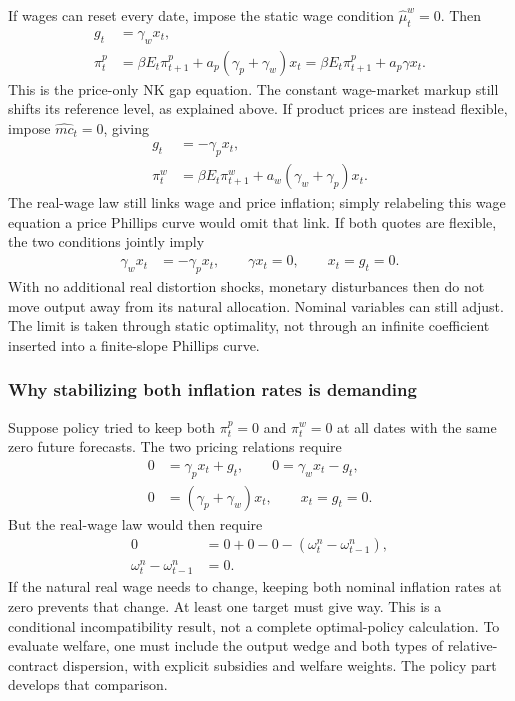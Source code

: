 If wages can reset every date, impose the static wage condition
$\hat\mu_t^w=0$. Then
\begin{align}
 g_t&=\gamma_wx_t,\\
 \pi_t^p&=\beta E_t\pi_{t+1}^p
              +a_p(\gamma_p+\gamma_w)x_t
        =\beta E_t\pi_{t+1}^p+a_p\gamma x_t.
\end{align}
This is the price-only NK gap equation. The constant wage-market markup still
shifts its reference level, as explained above. If product prices are instead
flexible, impose $\hat{mc}_t=0$, giving
\begin{align}
 g_t&=-\gamma_p x_t,\\
 \pi_t^w&=\beta E_t\pi_{t+1}^w
                  +a_w(\gamma_w+\gamma_p)x_t.
\end{align}
The real-wage law still links wage and price inflation; simply relabeling this
wage equation a price Phillips curve would omit that link. If both quotes
are flexible, the two conditions jointly imply
\begin{align}
 \gamma_wx_t&=-\gamma_px_t,\qquad
 \gamma x_t=0,\qquad x_t=g_t=0.
\end{align}
With no additional real distortion shocks, monetary disturbances then do not
move output away from its natural allocation. Nominal variables can still
adjust. The limit is taken through static optimality, not through an infinite
coefficient inserted into a finite-slope Phillips curve.

\subsubsection{Why stabilizing both inflation rates is demanding}

Suppose policy tried to keep both $\pi_t^p=0$ and $\pi_t^w=0$ at all dates
with the same zero future forecasts. The two pricing relations require
\begin{align}
 0&=\gamma_px_t+g_t,\qquad0=\gamma_wx_t-g_t,\\
 0&=(\gamma_p+\gamma_w)x_t,\qquad x_t=g_t=0.
\end{align}
But the real-wage law would then require
\begin{align}
 0&=0+0-0-(\omega_t^n-\omega_{t-1}^n),\\
 \omega_t^n-\omega_{t-1}^n&=0.
\end{align}
If the natural real wage needs to change, keeping both nominal inflation rates
at zero prevents that change. At least one target must give way. This is a
conditional incompatibility result, not a complete optimal-policy calculation.
To evaluate welfare, one must include the output wedge and both types of
relative-contract dispersion, with explicit subsidies and welfare weights.
The policy part develops that comparison.

